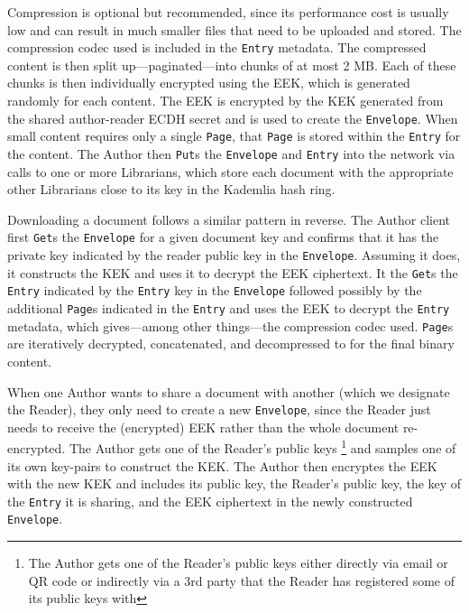 \documentclass[10pt]{article}
\newcommand{\ttt}[1]{\texttt{#1}}
\def\Entry{\ttt{Entry}}
\def\Page{\ttt{Page}}
\def\Envelope{\ttt{Envelope}}
\begin{document}
Compression is optional but recommended, since its performance cost is usually low and can result in much smaller files that need to be uploaded and stored. The compression codec used is included in the \Entry{} metadata. The compressed content is then split up---paginated---into chunks of at most 2 MB. Each of these chunks is then individually encrypted using the EEK, which is generated randomly for each content. The EEK is encrypted by the KEK generated from the shared author-reader ECDH secret and is used to create the \Envelope{}. When small content requires only a single \Page{}, that \Page{} is stored within the \Entry{} for the content. The Author then \ttt{Put}s the \Envelope{} and \Entry{} into the network via calls to one or more Librarians, which store each document with the appropriate other Librarians close to its key in the Kademlia hash ring. 

Downloading a document follows a similar pattern in reverse. The Author client first \ttt{Get}s the \Envelope{} for a given document key and confirms that it has the private key indicated by the reader public key in the \Envelope{}. Assuming it does, it constructs the KEK and uses it to decrypt the EEK ciphertext. It the \texttt{Get}s the \Entry{} indicated by the \Entry{} key in the \Envelope{} followed possibly by the additional \Page{}s indicated in the \Entry{} and uses the EEK to decrypt the \Entry{} metadata, which gives---among other things---the compression codec used. \Page{}s are iteratively decrypted, concatenated, and decompressed to for the final binary content. 

When one Author wants to share a document with another (which we designate the Reader), they only need to create a new \Envelope{}, since the Reader just needs to receive the (encrypted) EEK rather than the whole document re-encrypted. The Author gets one of the Reader's public keys \footnote{The Author gets one of the Reader's public keys either directly via email or QR code or indirectly via a 3rd party that the Reader has registered some of its public keys with} and samples one of its own key-pairs to construct the KEK. The Author then encryptes the EEK with the new KEK and includes its public key, the Reader's public key, the key of the \Entry{} it is sharing, and the EEK ciphertext in the newly constructed \Envelope{}. 
\end{document}
